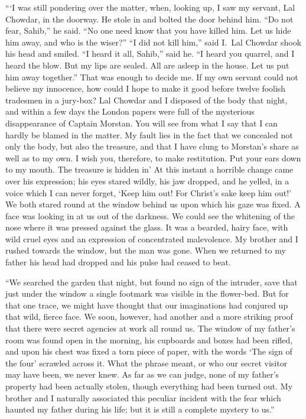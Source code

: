\documentclass[12pt,english,oneside]{book}
\begin{document}
{}```I was still pondering over the matter, when, looking up, I saw
my servant, Lal Chowdar, in the doorway. He stole in and bolted the
door behind him. {}``Do not fear, Sahib,'' he said. {}``No one
need know that you have killed him. Let us hide him away, and who
is the wiser?'' {}``I did not kill him,'' said I.\  Lal Chowdar
shook his head and smiled. {}``I heard it all, Sahib,'' said he.
{}``I heard you quarrel, and I heard the blow. But my lips are sealed.
All are asleep in the house. Let us put him away together.'' That
was enough to decide me. If my own servant could not believe my innocence,
how could I hope to make it good before twelve foolish tradesmen in
a jury-box? Lal Chowdar and I disposed of the body that night, and
within a few days the London papers were full of the mysterious disappearance
of Captain Morstan. You will see from what I say that I can hardly
be blamed in the matter. My fault lies in the fact that we concealed
not only the body, but also the treasure, and that I have clung to
Morstan's share as well as to my own. I wish you, therefore, to make
restitution. Put your ears down to my mouth. The treasure is hidden
in\mdsh{---}' At this instant a horrible change came over his expression;
his eyes stared wildly, his jaw dropped, and he yelled, in a voice
which I can never forget, `Keep him out! For Christ's sake keep him
out!' We both stared round at the window behind us upon which his
gaze was fixed. A face was looking in at us out of the darkness. We
could see the whitening of the nose where it was pressed against the
glass. It was a bearded, hairy face, with wild cruel eyes and an expression
of concentrated malevolence. My brother and I rushed towards the window,
but the man was gone. When we returned to my father his head had dropped
and his pulse had ceased to beat.

{}``We searched the garden that night, but found no sign of the intruder,
save that just under the window a single footmark was visible in the
flower-bed. But for that one trace, we might have thought that our
imaginations had conjured up that wild, fierce face. We soon, however,
had another and a more striking proof that there were secret agencies
at work all round us. The window of my father's room was found open
in the morning, his cupboards and boxes had been rifled, and upon
his chest was fixed a torn piece of paper, with the words `The sign
of the four' scrawled across it. What the phrase meant, or who our
secret visitor may have been, we never knew. As far as we can judge,
none of my father's property had been actually stolen, though everything
had been turned out. My brother and I naturally associated this peculiar
incident with the fear which haunted my father during his life; but
it is still a complete mystery to us.''
\end{document}
